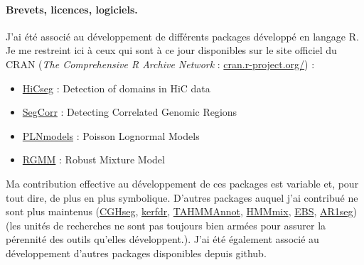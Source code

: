 
\paragraph{Brevets, licences, logiciels.} \todo{}
J'ai été associé au développement de différents packages développé en langage R. Je me restreint ici à ceux qui sont à ce jour disponibles sur le site officiel du CRAN ({\sl The Comprehensive R Archive Network} : \url{cran.r-project.org/}) :
\begin{itemize}
 \item \url{HiCseg} : Detection of domains in HiC data \cite{LDM14}
 \item \url{SegCorr} : Detecting Correlated Genomic Regions \cite{DLM17}
 \item \url{PLNmodels} : Poisson Lognormal Models \cite{CMR18a,CMR19,CMR21}
 \item \url{RGMM} : Robust Mixture Model \cite{GoR24}
\end{itemize}
Ma contribution effective au développement de ces packages est variable et, pour tout dire, de plus en plus symbolique. 
D'autres packages auquel j'ai contribué ne sont plus maintenus (\url{CGHseg}, \url{kerfdr}, \url{TAHMMAnnot}, \url{HMMmix}, \url{EBS}, \url{AR1seg}) (les unités de recherches ne sont pas toujours bien armées pour assurer la pérennité des outils qu'elles développent.). 
J'ai été également associé au développement d'autres packages disponibles depuis github.



